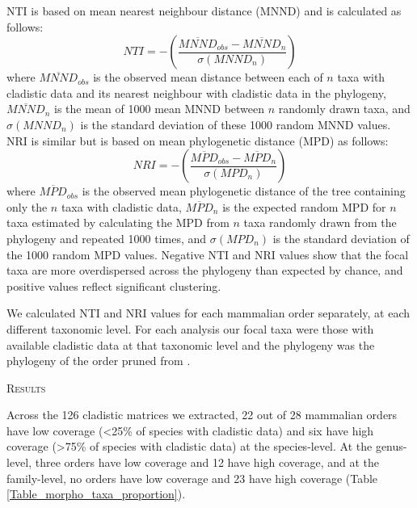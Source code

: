 \documentclass[12pt,letterpaper]{article}
\renewcommand{\section}[1]{%
\bigskip
\begin{center}
\begin{Large}
\normalfont\scshape #1
\medskip
\end{Large}
\end{center}}
\begin{document}
NTI \citep{webb2002phylogenies} is based on mean nearest neighbour distance (MNND) and is calculated as follows:
  \begin{equation}
    NTI=-\left(\frac{\overline{MNND}_{obs}-\overline{MNND}_{n}}{\sigma(MNND_{n})}\right)
  \end{equation}
where $\overline{MNND}_{obs}$ is the observed mean distance between each of $n$ taxa with cladistic data and its nearest neighbour with cladistic data in the phylogeny, 
$\overline{MNND}_{n}$ is the mean of 1000 mean MNND between $n$ randomly drawn taxa, and $\sigma(MNND_{n})$ is the standard deviation of these 1000 random MNND values.
NRI is similar but is based on mean phylogenetic distance (MPD) as follows:
  \begin{equation}
    NRI=-\left(\frac{\overline{MPD}_{obs}-\overline{MPD}_{n}}{\sigma(MPD_{n})}\right)
  \end{equation}
where $\overline{MPD}_{obs}$ is the observed mean phylogenetic distance of the tree containing only the $n$ taxa with cladistic data, $\overline{MPD}_{n}$ is the expected random MPD for $n$ taxa estimated by calculating the MPD from $n$ taxa randomly drawn from the phylogeny and repeated 1000 times, and $\sigma(MPD_{n})$ is the standard deviation of the 1000 random MPD values. %
Negative NTI and NRI values show that the focal taxa are more overdispersed across the phylogeny than expected by chance, and positive values reflect significant clustering.

We calculated NTI and NRI values for each mammalian order separately, at each different taxonomic level. 
For each analysis our focal taxa were those with available cladistic data at that taxonomic level and the phylogeny was the phylogeny of the order pruned from \citet{BinindaEmonds}.

%
%

\section{Results}
Across the 126 cladistic matrices we extracted, 22 out of 28 mammalian orders have low coverage (\textless 25\% of species with cladistic data) and six have high coverage (\textgreater 75\% of species with cladistic data) at the species-level.
At the genus-level, three orders have low coverage and 12 have high coverage, and at the family-level, no orders have low coverage and 23 have high coverage (Table \ref{Table_morpho_taxa_proportion}).
\end{document}
